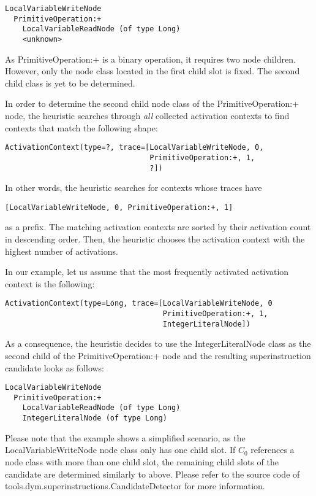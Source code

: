 \documentclass[10pt,a4paper]{article}
\begin{document}
\begin{verbatim}
LocalVariableWriteNode
  PrimitiveOperation:+
    LocalVariableReadNode (of type Long)
    <unknown>
\end{verbatim}

As \textsf{PrimitiveOperation:+} is a binary operation, it requires two node children. However, only the node class located in the first child slot is fixed. The second child class is yet to be determined.

In order to determine the second child node class of the \textsf{PrimitiveOperation:+} node, the heuristic searches through \emph{all} collected activation contexts to find contexts that match the following shape:

\begin{verbatim}
ActivationContext(type=?, trace=[LocalVariableWriteNode, 0,
                                 PrimitiveOperation:+, 1,
                                 ?])
\end{verbatim}

In other words, the heuristic searches for contexts whose traces have
\begin{verbatim}
[LocalVariableWriteNode, 0, PrimitiveOperation:+, 1]
\end{verbatim}
as a prefix. The matching activation contexts are sorted by their activation count in descending order. Then, the heuristic chooses the activation context with the highest number of activations.

In our example, let us assume that the most frequently activated activation context is the following:

\begin{verbatim}
ActivationContext(type=Long, trace=[LocalVariableWriteNode, 0
                                    PrimitiveOperation:+, 1,
                                    IntegerLiteralNode])
\end{verbatim}

As a consequence, the heuristic decides to use the \textsf{IntegerLiteralNode} class as the second child of the \textsf{PrimitiveOperation:+} node and the resulting superinstruction candidate looks as follows:

\begin{verbatim}
LocalVariableWriteNode
  PrimitiveOperation:+
    LocalVariableReadNode (of type Long)
    IntegerLiteralNode (of type Long)
\end{verbatim}

Please note that the example shows a simplified scenario, as the \textsf{LocalVariableWriteNode} node class only has one child slot. If $C_0$ references a node class with more than one child slot, the remaining child slots of the candidate are determined similarly to above. Please refer to the source code of \textsf{tools.dym.superinstructions.CandidateDetector} for more information.
\end{document}
